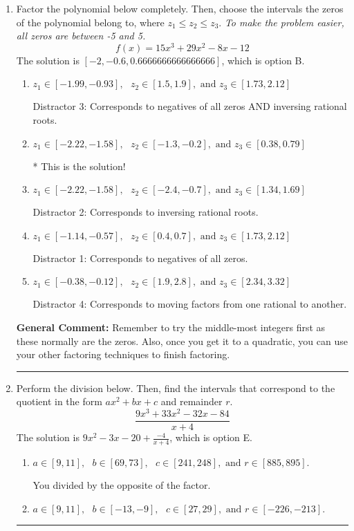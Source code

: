 \documentclass{extbook}[14pt]
\newcommand{\litem}[1]{\item #1

\rule{\textwidth}{0.4pt}}
\begin{document}
\begin{enumerate}\litem{
Factor the polynomial below completely. Then, choose the intervals the zeros of the polynomial belong to, where $z_1 \leq z_2 \leq z_3$. \textit{To make the problem easier, all zeros are between -5 and 5.}
\[ f(x) = 15x^{3} +29 x^{2} -8 x -12 \]The solution is \( [-2, -0.6, 0.6666666666666666] \), which is option B.\begin{enumerate}[label=\Alph*.]
\item \( z_1 \in [-1.99, -0.93], \text{   }  z_2 \in [1.5, 1.9], \text{   and   } z_3 \in [1.73, 2.12] \)

 Distractor 3: Corresponds to negatives of all zeros AND inversing rational roots.
\item \( z_1 \in [-2.22, -1.58], \text{   }  z_2 \in [-1.3, -0.2], \text{   and   } z_3 \in [0.38, 0.79] \)

* This is the solution!
\item \( z_1 \in [-2.22, -1.58], \text{   }  z_2 \in [-2.4, -0.7], \text{   and   } z_3 \in [1.34, 1.69] \)

 Distractor 2: Corresponds to inversing rational roots.
\item \( z_1 \in [-1.14, -0.57], \text{   }  z_2 \in [0.4, 0.7], \text{   and   } z_3 \in [1.73, 2.12] \)

 Distractor 1: Corresponds to negatives of all zeros.
\item \( z_1 \in [-0.38, -0.12], \text{   }  z_2 \in [1.9, 2.8], \text{   and   } z_3 \in [2.34, 3.32] \)

 Distractor 4: Corresponds to moving factors from one rational to another.
\end{enumerate}

\textbf{General Comment:} Remember to try the middle-most integers first as these normally are the zeros. Also, once you get it to a quadratic, you can use your other factoring techniques to finish factoring.
}
\litem{
Perform the division below. Then, find the intervals that correspond to the quotient in the form $ax^2+bx+c$ and remainder $r$.
\[ \frac{9x^{3} +33 x^{2} -32 x -84}{x + 4} \]The solution is \( 9x^{2} -3 x -20 + \frac{-4}{x + 4} \), which is option E.\begin{enumerate}[label=\Alph*.]
\item \( a \in [9, 11], \text{   } b \in [69, 73], \text{   } c \in [241, 248], \text{   and   } r \in [885, 895]. \)

 You divided by the opposite of the factor.
\item \( a \in [9, 11], \text{   } b \in [-13, -9], \text{   } c \in [27, 29], \text{   and   } r \in [-226, -213]. \)


\end{enumerate}}
\end{enumerate}
\end{document}
